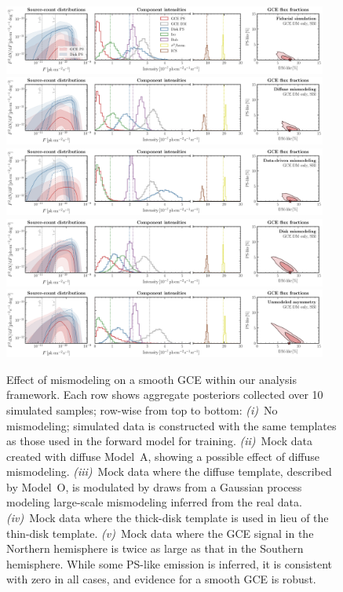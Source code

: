 \documentclass[prd,aps,10pt,nofootinbib,twocolumn,superscriptaddress,preprintnumbers,balancelastpage,longbibliography,floatfix]{revtex4-2}
\begin{document}
%
\begin{figure}[!htbp]
\centering
\includegraphics[width=0.95\textwidth]{plots/sim_sbi_dm_agg.pdf}
\includegraphics[width=0.95\textwidth]{plots/sim_sbi_modelA_dm.pdf}
\includegraphics[width=0.95\textwidth]{plots/sim_sbi_dm_mismo.pdf}
\includegraphics[width=0.95\textwidth]{plots/sim_sbi_thick_disk_mm_dm.pdf}
\includegraphics[width=0.95\textwidth]{plots/sim_sbi_dm_asym.pdf}
\caption{Effect of mismodeling on a smooth GCE within our analysis framework. Each row shows aggregate posteriors collected over 10 simulated samples; row-wise from top to bottom: \emph{(i)}~No mismodeling; simulated data is constructed with the same templates as those used in the forward model for training. \emph{(ii)}~Mock data created with diffuse {Model~A}, showing a possible effect of diffuse mismodeling. \emph{(iii)}~Mock data where the diffuse template, described by {Model~O}, is modulated by draws from a Gaussian process modeling large-scale mismodeling inferred from the real \Fermi data. \emph{(iv)}~Mock data where the thick-disk template is used in lieu of the thin-disk template. \emph{(v)}~Mock data where the GCE signal in the Northern hemisphere is twice as large as that in the Southern hemisphere. While some PS-like emission is inferred, it is consistent with zero in all cases, and evidence for a smooth GCE is robust.}
\label{fig:sim_sbi_mismo}
\end{figure}
%
\end{document}
